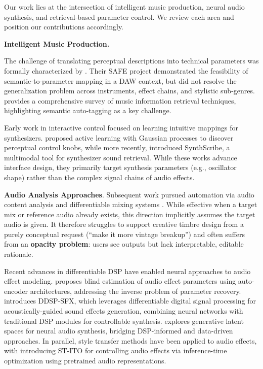 Our work lies at the intersection of intelligent music production, neural audio synthesis, and retrieval-based parameter control. We review each area and position our contributions accordingly.

\noindent\textbf{Intelligent Music Production.}

The challenge of translating perceptual descriptions into technical parameters was formally characterized by \citet{stables2014semantic}. Their SAFE project demonstrated the feasibility of semantic-to-parameter mapping in a DAW context, but did not resolve the generalization problem across instruments, effect chains, and stylistic sub-genres. \citet{schedl2014survey} provides a comprehensive survey of music information retrieval techniques, highlighting semantic auto-tagging as a key challenge.

Early work in interactive control focused on learning intuitive mappings for synthesizers. \citet{kuli2014active} proposed active learning with Gaussian processes to discover perceptual control knobs, while more recently, \citet{bryan2024synthscribe} introduced SynthScribe, a multimodal tool for synthesizer sound retrieval. While these works advance interface design, they primarily target synthesis parameters (e.g., oscillator shape) rather than the complex signal chains of audio effects.

\textbf{Audio Analysis Approaches}. Subsequent work pursued automation via audio content analysis and differentiable mixing systems \citep{steinmetz2022automix}. While effective when a target mix or reference audio already exists, this direction implicitly assumes the target audio is given. It therefore struggles to support creative timbre design from a purely conceptual request (``make it more vintage breakup'') and often suffers from an \textbf{opacity problem}: users see outputs but lack interpretable, editable rationale.

Recent advances in differentiable DSP have enabled neural approaches to audio effect modeling. \citet{peladeau2024blind} proposes blind estimation of audio effect parameters using auto-encoder architectures, addressing the inverse problem of parameter recovery. \citet{liu2024ddspSFX} introduces DDSP-SFX, which leverages differentiable digital signal processing for acoustically-guided sound effects generation, combining neural networks with traditional DSP modules for controllable synthesis. \citet{deemanat2025latent} explores generative latent spaces for neural audio synthesis, bridging DSP-informed and data-driven approaches. In parallel, style transfer methods have been applied to audio effects, with \citet{benetos2024stito} introducing ST-ITO for controlling audio effects via inference-time optimization using pretrained audio representations.

